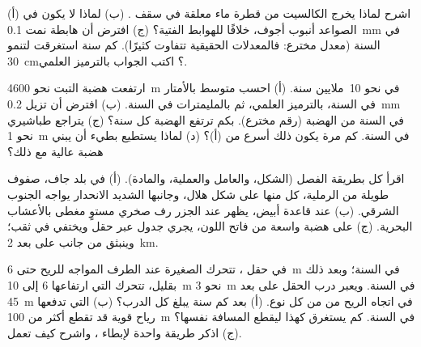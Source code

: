 \begin{exercise}[$\star\star$]\label{exo:g9:landforms:9}
(أ) اشرح لماذا يخرج الكالسيت من قطرة ماء معلقة في سقف . (ب) لماذا
لا يكون في الصواعد أنبوب أجوف، خلافًا للهوابط الفتية؟ (ج) افترض أن هابطة
نمت \qty{0.1}{mm} في السنة (معدل مخترع: فالمعدلات الحقيقية تتفاوت
كثيرًا). كم سنة استغرقت لتنمو \qty{30}{cm}؟ اكتب الجواب بالترميز
العلمي.
\end{exercise}

\begin{exercise}[$\star\star$]\label{exo:g9:landforms:10}
ارتفعت هضبة التبت نحو \qty{4600}{m} في نحو 10~ملايين سنة. (أ) احسب
متوسط  بالأمتار في السنة، بالترميز العلمي، ثم بالمليمترات في
السنة. (ب) افترض أن  تزيل \qty{0.2}{mm} في السنة من الهضبة (رقم
مخترع). بكم ترتفع الهضبة كل سنة؟ (ج) يتراجع  طباشيري نحو
\qty{1}{m} في السنة. كم مرة يكون ذلك أسرع من  (أ)؟ (د) لماذا
يستطيع  بطيء أن يبني هضبة عالية مع
ذلك؟
\end{exercise}

\begin{exercise}[$\star\star\star$]\label{exo:g9:landforms:11}
اقرأ كل  بطريقة الفصل (الشكل، والعامل والعملية، والمادة). (أ) في بلد
جاف، صفوف طويلة من  الرملية، كل منها على شكل هلال، وجانبها الشديد
الانحدار يواجه الجنوب الشرقي. (ب) عند قاعدة  أبيض، يظهر عند الجزر
رف صخري مستوٍ مغطى بالأعشاب البحرية. (ج) على هضبة واسعة من  فاتح
اللون، يجري جدول عبر حقل ويختفي في ثقب؛ وينبثق  من جانب  على
بعد
\qty{2}{km}.
\end{exercise}

\begin{exercise}[$\star\star\star$]\label{exo:g9:landforms:12}
في حقل ، تتحرك  الصغيرة عند الطرف المواجه للريح حتى
\qty{6}{m} في السنة؛ وبعد ذلك بقليل، تتحرك  التي ارتفاعها 6 إلى
\qty{10}{m} نحو \qty{3}{m} في السنة. ويعبر درب الحقل على بعد
\qty{45}{m} في اتجاه الريح من  من كل نوع. (أ) بعد كم سنة يبلغ كل
 الدرب؟ (ب)  التي تدفعها رياح قوية قد تقطع أكثر من
\qty{100}{m} في السنة. كم يستغرق  كهذا ليقطع المسافة نفسها؟
(ج) اذكر طريقة واحدة لإبطاء ، واشرح كيف تعمل.
\end{exercise}

